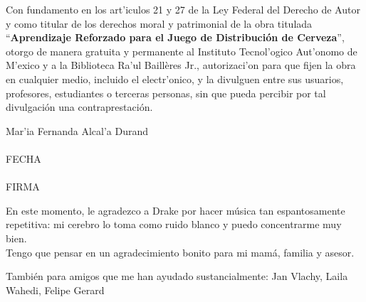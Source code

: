 
\newpage
\mbox{}
\thispagestyle{empty} %

\newpage
\thispagestyle{empty}
Con fundamento en los art'iculos 21 y 27 de la Ley Federal del
Derecho de Autor y como titular de los derechos moral y patrimonial de la obra titulada ``\textbf{Aprendizaje Reforzado para el Juego de Distribuci\'on de Cerveza}'', otorgo de manera gratuita y permanente al Instituto Tecnol'ogico Aut'onomo de M'exico y a la Biblioteca Ra'ul Baill\`eres Jr., autorizaci'on para que fijen la obra en cualquier medio, incluido el electr'onico, y la divulguen entre sus usuarios, profesores, estudiantes o terceras personas, sin que pueda percibir por tal divulgación una contraprestación.

\vspace{20 mm}
\begin{center}
Mar'ia Fernanda Alcal'a Durand\\

\vspace{20 mm}
\makebox[2in]{\hrulefill}\\
FECHA\\
\vspace{20 mm}
\makebox[2in]{\hrulefill}\\
FIRMA
\end{center}

\newpage
\mbox{}
\thispagestyle{empty} %



En este momento, le agradezco a Drake por hacer m\'usica tan espantosamente repetitiva: mi cerebro lo toma como ruido blanco y puedo concentrarme muy bien.\\

Tengo que pensar en un agradecimiento bonito para mi mam\'a, familia y asesor.

Tambi\'en para amigos que me han ayudado sustancialmente: Jan Vlachy, Laila Wahedi, Felipe Gerard

\newpage
\mbox{}
\thispagestyle{empty} %
